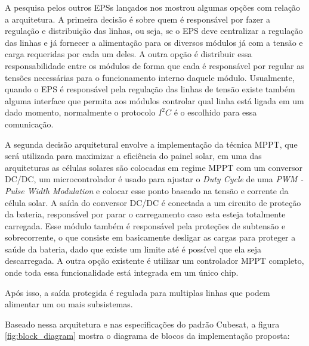 A pesquisa pelos outros EPSs lançados nos mostrou algumas opções com relação a arquitetura. A primeira decisão é sobre quem é responsável por fazer a regulação e distribuição das linhas, ou seja, se o EPS deve centralizar a regulação das linhas e já fornecer a alimentação para os diversos módulos já com a tensão e carga requeridas por cada um deles. A outra opção é distribuir essa responsabilidade entre os módulos de forma que cada é responsável por regular as tensões necessárias para o funcionamento interno daquele módulo. Usualmente, quando o EPS é responsável pela regulação das linhas de tensão existe também alguma interface que permita aos módulos controlar qual linha está ligada em um dado momento, normalmente o protocolo $I^{2}C$ é o escolhido para essa comunicação.

A segunda decisão arquitetural envolve a implementação da técnica MPPT, que será utilizada para maximizar a eficiência do painel solar, em uma das arquiteturas as células solares são colocadas em regime MPPT com um conversor DC/DC, um microcontrolador é usado para ajustar o \textit{Duty Cycle} de uma \textit{PWM - Pulse Width Modulation} e colocar esse ponto baseado na tensão e corrente da célula solar. A saída do conversor DC/DC é conectada a um circuito de proteção da bateria, responsável por parar o carregamento caso esta esteja totalmente carregada. Esse módulo também é responsável pela proteções de subtensão e sobrecorrente, o que consiste em basicamente desligar as cargas para proteger a saúde da bateria, dado que existe um limite até é possível que ela seja descarregada. A outra opção existente é utilizar um controlador MPPT completo, onde toda essa funcionalidade está integrada em um único chip.

Após isso, a saída protegida é regulada para multiplas linhas que podem alimentar um ou mais subsistemas. 

Baseado nessa arquitetura e nas especificações do padrão Cubesat, a figura \ref{fig:block_diagram} mostra o diagrama de blocos da implementação proposta:

\noindent
\begin{minipage}{\linewidth}
\label{fig:block_diagram}
\end{minipage}

